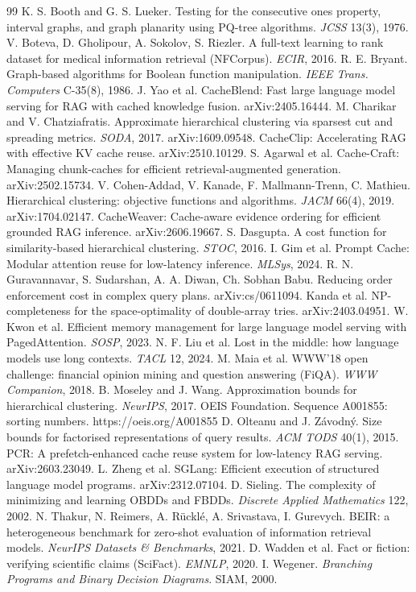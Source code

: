 \documentclass[11pt]{article}
\theoremstyle{plain}
\begin{document}
\begin{thebibliography}{99}
 K. S. Booth and G. S. Lueker. Testing for the consecutive ones property, interval graphs, and graph planarity using PQ-tree algorithms. \emph{JCSS} 13(3), 1976.
 V. Boteva, D. Gholipour, A. Sokolov, S. Riezler. A full-text learning to rank dataset for medical information retrieval (NFCorpus). \emph{ECIR}, 2016.
 R. E. Bryant. Graph-based algorithms for Boolean function manipulation. \emph{IEEE Trans. Computers} C-35(8), 1986.
 J. Yao et al. CacheBlend: Fast large language model serving for RAG with cached knowledge fusion. arXiv:2405.16444.
 M. Charikar and V. Chatziafratis. Approximate hierarchical clustering via sparsest cut and spreading metrics. \emph{SODA}, 2017. arXiv:1609.09548.
 CacheClip: Accelerating RAG with effective KV cache reuse. arXiv:2510.10129.
 S. Agarwal et al. Cache-Craft: Managing chunk-caches for efficient retrieval-augmented generation. arXiv:2502.15734.
 V. Cohen-Addad, V. Kanade, F. Mallmann-Trenn, C. Mathieu. Hierarchical clustering: objective functions and algorithms. \emph{JACM} 66(4), 2019. arXiv:1704.02147.
 CacheWeaver: Cache-aware evidence ordering for efficient grounded RAG inference. arXiv:2606.19667.
 S. Dasgupta. A cost function for similarity-based hierarchical clustering. \emph{STOC}, 2016.
 I. Gim et al. Prompt Cache: Modular attention reuse for low-latency inference. \emph{MLSys}, 2024.
 R. N. Guravannavar, S. Sudarshan, A. A. Diwan, Ch. Sobhan Babu. Reducing order enforcement cost in complex query plans. arXiv:cs/0611094.
 Kanda et al. NP-completeness for the space-optimality of double-array tries. arXiv:2403.04951.
 W. Kwon et al. Efficient memory management for large language model serving with PagedAttention. \emph{SOSP}, 2023.
 N. F. Liu et al. Lost in the middle: how language models use long contexts. \emph{TACL} 12, 2024.
 M. Maia et al. WWW'18 open challenge: financial opinion mining and question answering (FiQA). \emph{WWW Companion}, 2018.
 B. Moseley and J. Wang. Approximation bounds for hierarchical clustering. \emph{NeurIPS}, 2017.
 OEIS Foundation. Sequence A001855: sorting numbers. https://oeis.org/A001855
 D. Olteanu and J. Závodný. Size bounds for factorised representations of query results. \emph{ACM TODS} 40(1), 2015.
 PCR: A prefetch-enhanced cache reuse system for low-latency RAG serving. arXiv:2603.23049.
 L. Zheng et al. SGLang: Efficient execution of structured language model programs. arXiv:2312.07104.
 D. Sieling. The complexity of minimizing and learning OBDDs and FBDDs. \emph{Discrete Applied Mathematics} 122, 2002.
 N. Thakur, N. Reimers, A. Rücklé, A. Srivastava, I. Gurevych. BEIR: a heterogeneous benchmark for zero-shot evaluation of information retrieval models. \emph{NeurIPS Datasets \& Benchmarks}, 2021.
 D. Wadden et al. Fact or fiction: verifying scientific claims (SciFact). \emph{EMNLP}, 2020.
 I. Wegener. \emph{Branching Programs and Binary Decision Diagrams}. SIAM, 2000.
\end{thebibliography}
\end{document}
